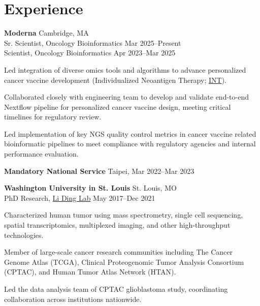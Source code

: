 \section{Experience}
\begin{entrylist}

\item \textbf{Moderna} \hfill Cambridge, MA\\
Sr. Scientist, Oncology Bioinformatics \hfill
Mar 2025--Present\\
Scientist, Oncology Bioinformatics \hfill
Apr 2023--Mar 2025
\begin{detaillist}
    \item Led integration of diverse omics tools and algorithms to advance personalized cancer vaccine development (Individualized Neoantigen Therapy; \href{https://en.wikipedia.org/wiki/MRNA-4157/V940}{INT}).
    \item Collaborated closely with engineering team to develop and validate end-to-end Nextflow pipeline for personalized cancer vaccine design, meeting critical timelines for regulatory review.
    \item Led implementation of key NGS quality control metrics in cancer vaccine related bioinformatic pipelines to meet compliance with regulatory agencies and internal performance evaluation.
\end{detaillist}

\item \textbf{Mandatory National Service} \hfill Taipei, Mar 2022--Mar 2023

\item \textbf{Washington University in St. Louis} \hfill St. Louis, MO\\
PhD Research, \href{https://dinglab.wustl.edu/}{Li Ding Lab} \hfill
May 2017--Dec 2021
\begin{detaillist}
    \item Characterized human tumor using mass spectrometry, single cell sequencing, spatial transcriptomics, multiplexed imaging, and other high-throughput technologies.
    \item Member of large-scale cancer research communities including The Cancer Genome Atlas (TCGA), Clinical Proteogenomic Tumor Analysis Consortium (CPTAC), and Human Tumor Atlas Network (HTAN).
    \item Led the data analysis team of CPTAC glioblastoma study, coordinating collaboration across institutions nationwide.
\end{detaillist}


\end{entrylist}
